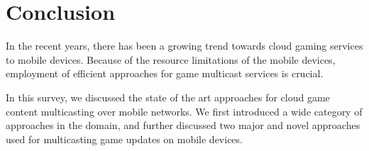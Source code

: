 \documentclass[conference]{IEEEtran}
\begin{document}
\section{Conclusion}
In the recent years, there has been a growing trend towards cloud gaming services to mobile devices. Because of the resource limitations of the mobile devices, employment of efficient approaches for game multicast services is crucial.

In this survey, we discussed the state of the art approaches for cloud game content multicasting over mobile networks. We first introduced a wide category of approaches in the domain, and further discussed two major and novel approaches used for multicasting game updates on mobile devices.


%




\end{document}
